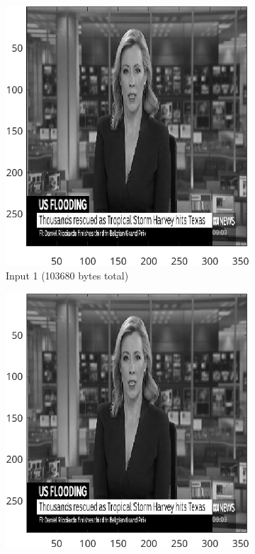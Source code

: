 \documentclass{article}
\begin{document}
	\begin{figure}[ht]
		\centering
		\begin{subfigure}[t]{0.45\textwidth}
			\centering

			\includegraphics[width=\textwidth]{2B_Input1Orig}

			\caption{Input  1 (103680 bytes total)}
			\label{fig:2B_Input1any}

		\end{subfigure}
		\hspace{1cm}
		\begin{subfigure}[t]{0.45\textwidth}
			\centering

			\includegraphics[width=\textwidth]{2B_Input1Ref}


\end{subfigure}
\end{figure}
\end{document}
